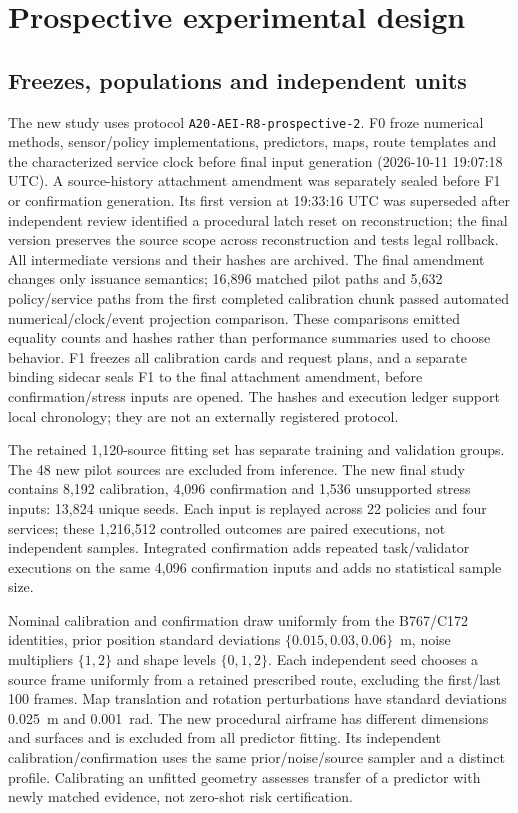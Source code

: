 \section{Prospective experimental design}\label{sec:design}
\subsection{Freezes, populations and independent units}
The new study uses protocol \texttt{A20-AEI-R8-prospective-2}. F0 froze numerical methods, sensor/policy implementations, predictors, maps, route templates and the characterized service clock before final input generation (2026-10-11 19:07:18 UTC). A source-history attachment amendment was separately sealed before F1 or confirmation generation. Its first version at 19:33:16 UTC was superseded after independent review identified a procedural latch reset on reconstruction; the final version preserves the source scope across reconstruction and tests legal rollback. All intermediate versions and their hashes are archived. The final amendment changes only issuance semantics; 16,896 matched pilot paths and 5,632 policy/service paths from the first completed calibration chunk passed automated numerical/clock/event projection comparison. These comparisons emitted equality counts and hashes rather than performance summaries used to choose behavior. F1 freezes all calibration cards and request plans, and a separate binding sidecar seals F1 to the final attachment amendment, before confirmation/stress inputs are opened. The hashes and execution ledger support local chronology; they are not an externally registered protocol.

The retained 1,120-source fitting set has separate training and validation groups. The 48 new pilot sources are excluded from inference. The new final study contains 8,192 calibration, 4,096 confirmation and 1,536 unsupported stress inputs: 13,824 unique seeds. Each input is replayed across 22 policies and four services; these 1,216,512 controlled outcomes are paired executions, not independent samples. Integrated confirmation adds repeated task/validator executions on the same 4,096 confirmation inputs and adds no statistical sample size.

Nominal calibration and confirmation draw uniformly from the B767/C172 identities, prior position standard deviations $\{0.015,0.03,0.06\}$~m, noise multipliers $\{1,2\}$ and shape levels $\{0,1,2\}$. Each independent seed chooses a source frame uniformly from a retained prescribed route, excluding the first/last 100 frames. Map translation and rotation perturbations have standard deviations 0.025~m and 0.001~rad. The new procedural airframe has different dimensions and surfaces and is excluded from all predictor fitting. Its independent calibration/confirmation uses the same prior/noise/source sampler and a distinct profile. Calibrating an unfitted geometry assesses transfer of a predictor with newly matched evidence, not zero-shot risk certification.

